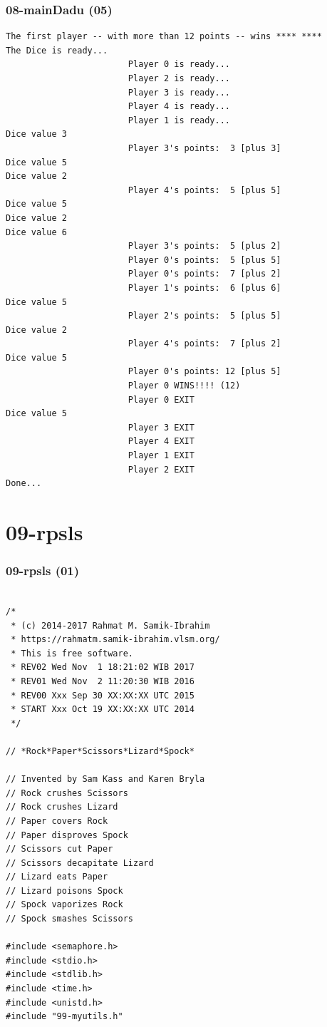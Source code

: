 \documentclass[xcolor=table, notheorems, hyperref={pdfpagelabels=false}]{beamer}
\begin{document}
\begin{frame}[fragile]
\frametitle{08-mainDadu (05)}
\begin{lstlisting}[basicstyle=\ttfamily\tiny]
The first player -- with more than 12 points -- wins **** ****
The Dice is ready...
                        Player 0 is ready...
                        Player 2 is ready...
                        Player 3 is ready...
                        Player 4 is ready...
                        Player 1 is ready...
Dice value 3
                        Player 3's points:  3 [plus 3] 
Dice value 5
Dice value 2
                        Player 4's points:  5 [plus 5] 
Dice value 5
Dice value 2
Dice value 6
                        Player 3's points:  5 [plus 2] 
                        Player 0's points:  5 [plus 5] 
                        Player 0's points:  7 [plus 2] 
                        Player 1's points:  6 [plus 6] 
Dice value 5
                        Player 2's points:  5 [plus 5] 
Dice value 2
                        Player 4's points:  7 [plus 2] 
Dice value 5
                        Player 0's points: 12 [plus 5] 
                        Player 0 WINS!!!! (12)
                        Player 0 EXIT
Dice value 5
                        Player 3 EXIT
                        Player 4 EXIT
                        Player 1 EXIT
                        Player 2 EXIT
Done...
\end{lstlisting}
\end{frame}

\section{09-rpsls}
\begin{frame}[fragile]
\frametitle{09-rpsls (01)}
\begin{lstlisting}[basicstyle=\ttfamily\tiny]

/*
 * (c) 2014-2017 Rahmat M. Samik-Ibrahim
 * https://rahmatm.samik-ibrahim.vlsm.org/
 * This is free software.
 * REV02 Wed Nov  1 18:21:02 WIB 2017
 * REV01 Wed Nov  2 11:20:30 WIB 2016
 * REV00 Xxx Sep 30 XX:XX:XX UTC 2015
 * START Xxx Oct 19 XX:XX:XX UTC 2014
 */

// *Rock*Paper*Scissors*Lizard*Spock*

// Invented by Sam Kass and Karen Bryla
// Rock crushes Scissors
// Rock crushes Lizard
// Paper covers Rock
// Paper disproves Spock
// Scissors cut Paper
// Scissors decapitate Lizard
// Lizard eats Paper
// Lizard poisons Spock
// Spock vaporizes Rock
// Spock smashes Scissors

#include <semaphore.h>
#include <stdio.h>
#include <stdlib.h>
#include <time.h>
#include <unistd.h>
#include "99-myutils.h"

\end{lstlisting}
\end{frame}
\end{document}
